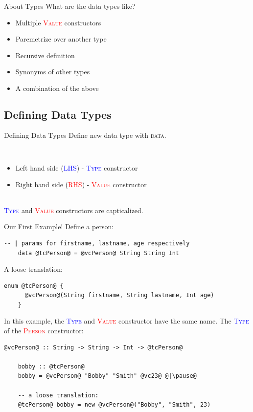 \documentclass[xcolor={usenames,dvipsnames}]{beamer}
\newcommand{\hkeyword}[1]{\textcolor{TealBlue}{\textsc{#1}}}
\newcommand{\htycon}[1]{\textcolor{Blue}{\textsc{#1}}}
\newcommand{\hvalcon}[1]{\textcolor{Red}{\textsc{#1}}}
\begin{document}
\begin{frame}[fragile]{About Types}
  What are the data types like?
  \pause
  \begin{itemize}
    \item Multiple \hvalcon{Value} constructors
    \pause
    \item Paremetrize over another type
    \pause
    \item Recursive definition
    \pause
    \item Synonyms of other types
    \pause
    \item A combination of the above
  \end{itemize}
\end{frame}

\subsection{Defining Data Types}
\begin{frame}[fragile]{Defining Data Types}
  Define new data type with \hkeyword{data}.

  \pause
  \ \\
  \begin{itemize}
    \item Left hand side (\htycon{LHS}) - \htycon{Type} constructor
    \item Right hand side (\hvalcon{RHS}) - \hvalcon{Value} constructor
  \end{itemize}

  \pause
  \ \\
  \htycon{Type} and \hvalcon{Value} constructors are capticalized.
\end{frame}

\begin{frame}[fragile]{Our First Example!}
  Define a person:
  \begin{lstlisting}[style=hask]
    -- | params for firstname, lastname, age respectively
    data @tcPerson@ = @vcPerson@ String String Int
  \end{lstlisting}

  \pause
  A loose translation:
  \begin{lstlisting}[style=hask]
    enum @tcPerson@ {
      @vcPerson@(String firstname, String lastname, Int age)
    }
  \end{lstlisting}

  \pause
  In this example, the \htycon{Type} and \hvalcon{Value} constructor have the same name. The \htycon{Type} of the \hvalcon{Person} constructor:
  \begin{lstlisting}[style=hask]
    @vcPerson@ :: String -> String -> Int -> @tcPerson@

    bobby :: @tcPerson@
    bobby = @vcPerson@ "Bobby" "Smith" @vc23@ @|\pause@

    -- a loose translation:
    @tcPerson@ bobby = new @vcPerson@("Bobby", "Smith", 23)
  \end{lstlisting}
\end{frame}
\end{document}
